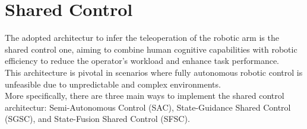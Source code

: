 \begin{itemize}
\end{itemize}


\section{Shared Control}
\label{Chapter2/PerspProj}
The adopted architectur to infer the teleoperation of the robotic arm is the shared control one, aiming to combine human cognitive capabilities with robotic efficiency to reduce the operator's workload and enhance task performance.\\
This architecture is pivotal in scenarios where fully autonomous robotic control is unfeasible due to unpredictable and complex environments.\\ 
More specifically, there are three main ways to implement the shared control architectur: Semi-Autonomous Control (SAC), State-Guidance Shared Control (SGSC), and State-Fusion Shared Control (SFSC).

